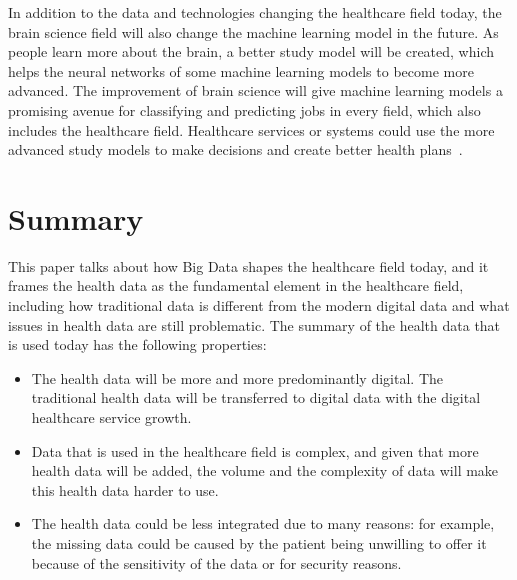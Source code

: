 In addition to the data and technologies 
changing the healthcare 
field today, the 
brain science field will also change the 
machine learning model in the future. 
As people learn more about the brain, 
a better study model will be created,
which helps the neural networks of 
some machine learning models to 
become more advanced. 
The improvement of brain science will give 
machine learning models a promising 
avenue for classifying 
and predicting jobs in every field, which also 
includes the healthcare 
field. Healthcare services or systems could use 
the more advanced 
study models to make decisions and create better 
health plans~\cite{brain}.

\section{Summary}
This paper talks about how Big Data shapes 
the healthcare field today, 
and it frames the health data as the 
fundamental element in the healthcare 
field, including how traditional 
data is different from the modern digital 
data and what issues in health 
data are still 
problematic. The summary of the health 
data that is used today has the 
following properties:
\begin{itemize}
	\item The health data will be more and 
	more predominantly digital. 
	The traditional health data will be 
	transferred to digital data with the digital 
	healthcare service growth.
	\item Data that is used in the healthcare field is complex, 
	and given that more health data will be added, 
	the volume and the complexity of data will make this health 
	data harder to use.
	\item The health data could be less 
	integrated due to many reasons: 
	for example, the 
	missing data could be caused by the patient being 
	unwilling to offer it because of the sensitivity 
	of the data or for security reasons.
\end{itemize}

